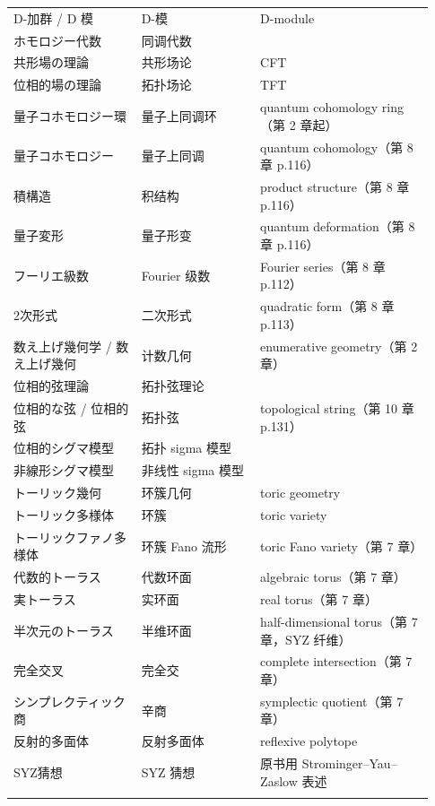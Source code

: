 \begin{longtable}{@{}>{\raggedright\arraybackslash}p{0.29\linewidth}>{\raggedright\arraybackslash}p{0.26\linewidth}>{\raggedright\arraybackslash}p{0.38\linewidth}@{}}
D-加群 / D 模 & \mbox{D-模} & D-module \\
ホモロジー代数 & \mbox{同调代数} &  \\
共形場の理論 & \mbox{共形场论} & CFT \\
位相的場の理論 & \mbox{拓扑场论} & TFT \\
量子コホモロジー環 & \mbox{量子上同调环} & quantum cohomology ring（第 2 章起） \\
量子コホモロジー & \mbox{量子上同调} & quantum cohomology（第 8 章 p.116） \\
積構造 & \mbox{积结构} & product structure（第 8 章 p.116） \\
量子変形 & \mbox{量子形变} & quantum deformation（第 8 章 p.116） \\
フーリエ級数 & Fourier \mbox{级数} & Fourier series（第 8 章 p.112） \\
2次形式 & \mbox{二次形式} & quadratic form（第 8 章 p.113） \\
数え上げ幾何学 / 数え上げ幾何 & \mbox{计数几何} & enumerative geometry（第 2 章） \\
位相的弦理論 & \mbox{拓扑弦理论} &  \\
位相的な弦 / 位相的弦 & \mbox{拓扑弦} & topological string（第 10 章 p.131） \\
位相的シグマ模型 & \mbox{拓扑} sigma \mbox{模型} &  \\
非線形シグマ模型 & \mbox{非线性} sigma \mbox{模型} &  \\
トーリック幾何 & \mbox{环簇几何} & toric geometry \\
トーリック多様体 & \mbox{环簇} & toric variety \\
トーリックファノ多様体 & \mbox{环簇} Fano \mbox{流形} & toric Fano variety（第 7 章） \\
代数的トーラス & \mbox{代数环面} & algebraic torus（第 7 章） \\
実トーラス & \mbox{实环面} & real torus（第 7 章） \\
半次元のトーラス & \mbox{半维环面} & half-dimensional torus（第 7 章，SYZ 纤维） \\
完全交叉 & \mbox{完全交} & complete intersection（第 7 章） \\
シンプレクティック商 & \mbox{辛商} & symplectic quotient（第 7 章） \\
反射的多面体 & \mbox{反射多面体} & reflexive polytope \\
SYZ猜想 & SYZ \mbox{猜想} & 原书用 Strominger--Yau--Zaslow 表述 \\
\multicolumn{3}{@{}l}{\textbf{二、基础数学用语}}\\

\end{longtable}
